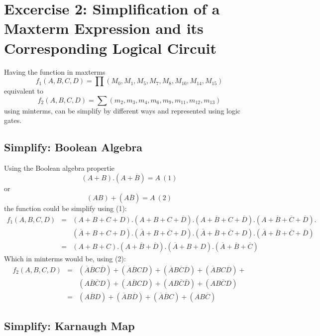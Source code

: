 \section{\color{olive}Excercise 2: Simplification of a Maxterm Expression and its Corresponding Logical Circuit}

Having the function in maxterms $$f_1 (A,B,C,D) = \prod\left(M_0, M_1 , M_5 , M_7 , M_8 , M_{10} , M_{14} , M_{15} \right)$$ equivalent to $$f_2 (A,B,C,D) = \sum\left(m_2, m_3 , m_4 , m_6 , m_9 , m_{11} , m_{12} , m_{13} \right)$$ using minterms, can be simplify by different ways and represented using logic gates.

    \subsection{\color{purple}Simplify: Boolean Algebra}

    Using the Boolean algebra propertie $$(A+B).(A+\overline{B})=A~(1)$$ or $$(AB)+(A\overline{B})=A~(2)$$ the function could be simplify using (1):
    \begin{eqnarray*}
        f_1 (A,B,C,D) &= &(A+B+C+D).(A+B+C+\overline{D}).(A+\overline{B}+C+\overline{D}).(A+\overline{B}+\overline{C}+\overline{D}).\\
        &&(\overline{A}+B+C+D).(\overline{A}+B+\overline{C}+D).(\overline{A}+\overline{B}+\overline{C}+D).(\overline{A}+\overline{B}+\overline{C}+\overline{D}) \\
        &=&(A+B+C).(A+\overline{B}+\overline{D}).(\overline{A}+B+D).(\overline{A}+\overline{B}+\overline{C})
    \end{eqnarray*}
    Which in minterms would be, using (2):
    \begin{eqnarray*}
        f_2(A,B,C,D) &= &(\overline{A}\overline{B}C\overline{D})+(\overline{A}\overline{B}CD)+(\overline{A}B\overline{C}\overline{D})+(\overline{A}BC\overline{D})+\\
        &&(A\overline{B}\overline{C}D)+(A\overline{B}CD)+(AB\overline{C}\overline{D})+(AB\overline{C}D)\\
        &=&(A\overline{B}D)+(\overline{A}B\overline{D})+(\overline{A}\overline{B}C)+(AB\overline{C})
    \end{eqnarray*}

    \subsection{\color{purple}Simplify: Karnaugh Map}


